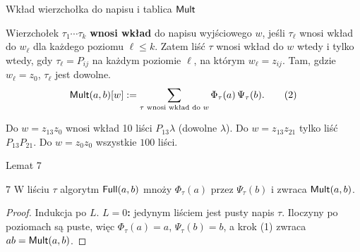 \begin{frame}{Wkład wierzchołka do napisu i tablica $\mathsf{Mult}$}
  \begin{definicja}
    Wierzchołek $\tau_1\cdots\tau_k$ \textbf{wnosi wkład} do napisu wyjściowego $w$, jeśli $\tau_\ell$ wnosi wkład
    do $w_\ell$ dla każdego poziomu $\ell\le k$. Zatem liść $\tau$ wnosi wkład do $w$ wtedy i tylko wtedy, gdy $\tau_\ell=P_{ij}$
    na każdym poziomie $\ell$, na którym $w_\ell=z_{ij}$. Tam, gdzie $w_\ell=z_0$, $\tau_\ell$ jest dowolne.
    \[
      \mathsf{Mult}(a,b)[w]:=\sum_{\tau\text{ wnosi wkład do }w}\Phi_\tau(a)\,\Psi_\tau(b).\tag{2}
    \]
  \end{definicja}
  \pause
  \pause
  \begin{przyklad}[$L=2$]
    Do $w=z_{13}z_0$ wnosi wkład 10 liści $P_{13}\lambda$ (dowolne $\lambda$). Do $w=z_{13}z_{21}$ tylko liść $P_{13}P_{21}$.
    Do $w=z_0z_0$ wszystkie $100$ liści.
  \end{przyklad}
\end{frame}

\begin{frame}{Lemat 7}
  \begin{lemat}{7}
    W liściu $\tau$ algorytm $\mathsf{Full}(a,b)$ mnoży $\Phi_\tau(a)$ przez $\Psi_\tau(b)$ i zwraca $\mathsf{Mult}(a,b)$.
  \end{lemat}
  \pause
  \begin{proof}\small
    \setlength{\abovedisplayskip}{3pt}\setlength{\belowdisplayskip}{3pt}
    Indukcja po $L$.
    \textbf{$L=0$:} jedynym liściem jest pusty napis $\tau$. Iloczyny po poziomach są puste, więc
    $\Phi_\tau(a)=a$, $\Psi_\tau(b)=b$, a krok (1) zwraca $ab=\mathsf{Mult}(a,b)$.


  \end{proof}
\end{frame}

